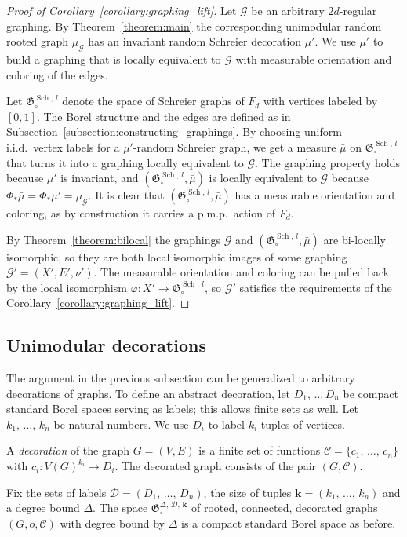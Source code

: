\documentclass[11pt]{article}
\theoremstyle{definition}
\numberwithin{equation}{section}
\numberwithin{figure}{section}
\numberwithin{table}{section}
\newcommand{\bfk}{\mathbf{k}}
\newcommand{\G}{\mathcal{G}}
\newcommand{\clD}{\mathcal{D}}
\newcommand{\clC}{\mathcal{C}}
\newcommand{\GoG}{\mathfrak{G}}
\DeclareMathOperator{\Sch}{Sch}
\begin{document}
\begin{proof}[Proof of Corollary~\ref{corollary:graphing_lift}]
Let $\G$ be an arbitrary $2d$-regular graphing. By Theorem~\ref{theorem:main} the corresponding unimodular random rooted graph $\mu_{\G}$ has an invariant random Schreier decoration $\mu'$. We use $\mu'$ to build a graphing that is locally equivalent to $\G$ with measurable orientation and coloring of the edges.

Let $\GoG_{\circ}^{\Sch,\,l}$ denote the space of Schreier graphs of $F_d$ with vertices labeled by $[0,1]$. The Borel structure and the edges are defined as in Subsection~\ref{subsection:constructing_graphings}. By choosing uniform i.i.d.\ vertex labels for a $\mu'$-random Schreier graph, we get a measure $\bar{\mu}$ on $\GoG_{\circ}^{\Sch,\,l}$ that turns it into a graphing locally equivalent to $\G$. The graphing property holds because $\mu'$ is invariant, and $(\GoG_{\circ}^{\Sch,\,l}, \bar{\mu})$ is locally equivalent to $\G$ because $\Phi_{*}\bar{\mu}=\Phi_{*}\mu'=\mu_{\G}$. It is clear that $(\GoG_{\circ}^{\Sch,\,l}, \bar{\mu})$ has a measurable orientation and coloring, as by construction it carries a p.m.p.\ action of $F_d$.

By Theorem~\ref{theorem:bilocal} the graphings $\G$ and $(\GoG_{\circ}^{\Sch,\,l}, \bar{\mu})$ are bi-locally isomorphic, so they are both local isomorphic images of some graphing $\G'=(X', E', \nu')$. The measurable orientation and coloring can be pulled back by the local isomorphism $\varphi: X' \to \GoG_{\circ}^{\Sch,\,l}$, so $\G'$ satisfies the requirements of the Corollary~\ref{corollary:graphing_lift}.
\end{proof}

\subsection{Unimodular decorations}

The argument in the previous subsection can be generalized to arbitrary decorations of graphs. To define an abstract decoration, let $D_1,\,\ldots \,D_n$ be compact standard Borel spaces serving as labels; this allows finite sets as well. Let $k_1, \,\ldots,\,k_n$ be natural numbers. We use $D_i$ to label $k_i$-tuples of vertices.

A \emph{decoration} of the graph $G=(V,E)$ is a finite set of functions $\clC=\{c_1,\,\ldots,\,c_n\}$ with $c_i:V(G)^{k_i} \to D_i$. The decorated graph consists of the pair $(G,\clC)$.

Fix the sets of labels $\clD= (D_1,\,\dots,\,D_n)$, the size of tuples $\bfk=(k_1,\,\ldots,\,k_n)$ and a degree bound $\Delta$. The space $\GoG_{\circ}^{\Delta,\,\clD,\,\bfk}$ of rooted, connected, decorated graphs $(G,o,\clC)$ with degree bound by $\Delta$ is a compact standard Borel space as before.
\end{document}
